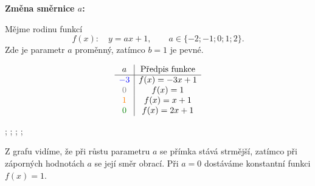 \documentclass[12pt,a4paper]{article}
\begin{document}
\newpage
\begin{examplebox}
\textbf{Změna směrnice \(a\):}  

Mějme rodinu funkcí 
\[
f(x):\quad y = a x + 1, \qquad a \in \{-2; -1; 0; 1; 2\}.
\]
Zde je parametr \(a\) proměnný, zatímco \(b = 1\) je pevné.

\[
\begin{array}{c|c}
a & \text{Předpis funkce} \\ \hline
\textcolor{blue}{-3}  & f(x) = -3x + 1 \\
\textcolor{black!50}{0}  & f(x) = 1 \\
\textcolor{orange}{1}  & f(x) = x + 1 \\
\textcolor{green!50!black}{0}  & f(x) = 2x + 1
\end{array}
\]

\begin{center}
\begin{axisgraph}[
    grid=none,
    xmin=-3, xmax=3,
    ymin=-3, ymax=5,
    title={Různé hodnoty $a$ při $b=1$},
    axis lines=middle,
    width=9cm,
    height=6cm,
    domain=-3:3,
    samples=2
]
    ;
    ;
    ;
    ;
\end{axisgraph}
\end{center}

Z grafu vidíme, že při růstu parametru \(a\) se přímka stává strmější,  
zatímco při záporných hodnotách \(a\) se její směr obrací.  
Při \(a = 0\) dostáváme konstantní funkci \(f(x) = 1\).
\end{examplebox}
\end{document}
